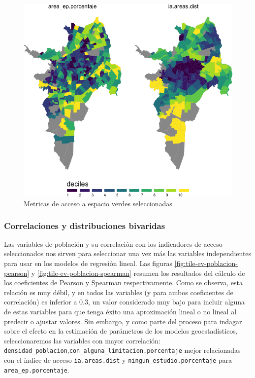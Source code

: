 \documentclass[12pt,]{book}
\begin{document}
\begin{figure}
\includegraphics[width=1\linewidth]{tesis-unigis_files/figure-latex/mapa-dependienteEV-sel-1} \caption{Metricas de acceso a espacio verdes seleccionadas}\label{fig:mapa-dependienteEV-sel}
\end{figure}

\subsubsection{Correlaciones y distribuciones
bivaridas}\label{correlaciones-y-distribuciones-bivaridas}

Las variables de población y su correlación con los indicadores de
acceso seleccionados nos sirven para seleccionar una vez más las
variables independientes para usar en los modelos de regresión lineal.
Las figuras \ref{fig:tile-ev-poblacion-pearson} y
\ref{fig:tile-ev-poblacion-spearman} resumen los resultados del cálculo
de los coeficientes de Pearson y Spearman respectivamente. Como se
observa, esta relación es muy débil, y en todos las variables (y para
ambos coeficientes de correlación) es inferior a 0.3, un valor
considerado muy bajo para incluir alguna de estas variables para que
tenga éxito una aproximación lineal o no lineal al predecir o ajustar
valores. Sin embargo, y como parte del proceso para indagar sobre el
efecto en la estimación de parámetros de los modelos geoestadísticos,
seleccionaremos las variables con mayor correlación:
\texttt{densidad\_poblacion},\texttt{con\_alguna\_limitacion.porcentaje}
mejor relacionadas con el índice de acceso \texttt{ia.areas.dist} y
\texttt{ningun\_estudio.porcentaje} para \texttt{area\_ep.porcentaje}.
\end{document}
